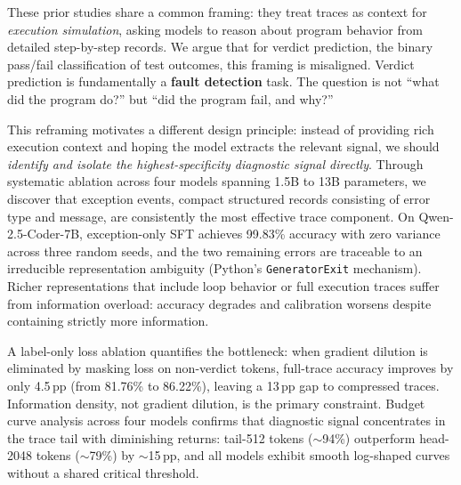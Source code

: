 \documentclass[11pt,a4paper]{article}
\newcommand{\pp}{\,pp}
\begin{document}
These prior studies share a common framing: they treat traces as context for \emph{execution simulation}, asking models to reason about program behavior from detailed step-by-step records. We argue that for verdict prediction, the binary pass/fail classification of test outcomes, this framing is misaligned. Verdict prediction is fundamentally a \textbf{fault detection} task. The question is not ``what did the program do?'' but ``did the program fail, and why?''

This reframing motivates a different design principle: instead of providing rich execution context and hoping the model extracts the relevant signal, we should \emph{identify and isolate the highest-specificity diagnostic signal directly}. Through systematic ablation across four models spanning 1.5B to 13B parameters, we discover that exception events, compact structured records consisting of error type and message, are consistently the most effective trace component. On Qwen-2.5-Coder-7B, exception-only SFT achieves 99.83\% accuracy with zero variance across three random seeds, and the two remaining errors are traceable to an irreducible representation ambiguity (Python's \texttt{GeneratorExit} mechanism). Richer representations that include loop behavior or full execution traces suffer from information overload: accuracy degrades and calibration worsens despite containing strictly more information.

A label-only loss ablation quantifies the bottleneck: when gradient dilution is eliminated by masking loss on non-verdict tokens, full-trace accuracy improves by only 4.5\pp{} (from 81.76\% to 86.22\%), leaving a 13\pp{} gap to compressed traces. Information density, not gradient dilution, is the primary constraint. Budget curve analysis across four models confirms that diagnostic signal concentrates in the trace tail with diminishing returns: tail-512 tokens ($\sim$94\%) outperform head-2048 tokens ($\sim$79\%) by $\sim$15\pp, and all models exhibit smooth log-shaped curves without a shared critical threshold.
\end{document}

